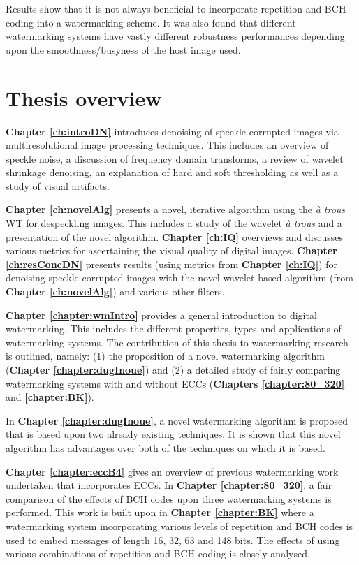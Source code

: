 \documentclass[12pt]{report}
\begin{document}
Results show that it is not always beneficial to incorporate repetition and BCH coding into a watermarking scheme. It was also found that
different watermarking systems have vastly different robustness performances depending upon the smoothness/busyness of the host image used.

\section{Thesis overview}
{\bf Chapter \ref{ch:introDN}} introduces denoising of speckle corrupted images via multiresolutional
image processing techniques. This includes an overview of speckle noise, a discussion of frequency domain
transforms, a review of wavelet shrinkage denoising, an explanation of hard and soft thresholding as well as
a study of visual artifacts.
 
{\bf Chapter \ref{ch:novelAlg}} presents a novel, iterative algorithm using the \emph{\`a trous} WT for despeckling
images. This includes a study of the wavelet \emph{\`a trous} and a presentation of the novel algorithm.
{\bf Chapter \ref{ch:IQ}} overviews and discusses various metrics for ascertaining the visual
quality of digital images. {\bf Chapter \ref{ch:resConcDN}} presents results (using  metrics from {\bf Chapter \ref{ch:IQ}})
for denoising speckle corrupted images with the novel wavelet based algorithm (from {\bf Chapter \ref{ch:novelAlg}}) and
various other filters.

{\bf Chapter \ref{chapter:wmIntro}} provides a general introduction to digital watermarking.
This includes the different properties, types and applications of watermarking systems.
The contribution of this thesis to watermarking research is outlined, namely:
(1) the proposition of a novel watermarking algorithm ({\bf Chapter \ref{chapter:dugInoue}})
and (2) a detailed study of
fairly comparing watermarking systems with and without ECCs
({\bf Chapters \ref{chapter:80_320}} and {\bf \ref{chapter:BK}}).
 
In {\bf Chapter \ref{chapter:dugInoue}}, a novel watermarking algorithm is proposed that
is based upon two already existing techniques. It is shown that this novel algorithm
has advantages over both of the techniques on which it is based.

{\bf Chapter \ref{chapter:eccB4}} gives an overview of previous watermarking work
undertaken that incorporates ECCs.
In {\bf Chapter \ref{chapter:80_320}}, a fair comparison of the effects
of BCH codes upon three watermarking systems is
performed.
This work is built upon in {\bf Chapter \ref{chapter:BK}} where a
watermarking system incorporating
various levels of repetition and BCH codes is used to embed messages of length 16, 32, 63 and 148 bits.
The effects of using various combinations of repetition and BCH coding is closely
analysed.
 
\end{document}
